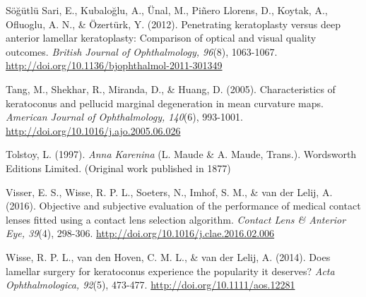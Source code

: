 \documentclass[authordate, empirical,issue]{jote-new-article}
\begin{document}
	Söğütlü Sari, E., Kubaloğlu, A., Ünal, M., Piñero Llorens, D., Koytak, A., Ofluoglu, A. N., \& Özertürk, Y. (2012). Penetrating keratoplasty versus deep anterior lamellar keratoplasty: Comparison of optical and visual quality outcomes. \emph{British Journal of Ophthalmology, 96}(8), 1063-1067. \url{http://doi.org/10.1136/bjophthalmol-2011-301349}



	Tang, M., Shekhar, R., Miranda, D., \& Huang, D. (2005). Characteristics of keratoconus and pellucid marginal degeneration in mean curvature maps. \emph{American Journal of Ophthalmology, 140}(6), 993-1001. \url{http://doi.org/10.1016/j.ajo.2005.06.026}



	Tolstoy, L. (1997). \emph{Anna Karenina} (L. Maude \& A. Maude, Trans.). Wordsworth Editions Limited. (Original work published in 1877)



	Visser, E. S., Wisse, R. P. L., Soeters, N., Imhof, S. M., \& van der Lelij, A. (2016). Objective and subjective evaluation of the performance of medical contact lenses fitted using a contact lens selection algorithm. \emph{Contact Lens \& Anterior Eye, 39}(4), 298-306. \url{http://doi.org/10.1016/j.clae.2016.02.006}



	Wisse, R. P. L., van den Hoven, C. M. L., \& van der Lelij, A. (2014). Does lamellar surgery for keratoconus experience the popularity it deserves? \emph{Acta Ophthalmologica, 92}(5), 473-477. \url{http://doi.org/10.1111/aos.12281}
\end{document}
